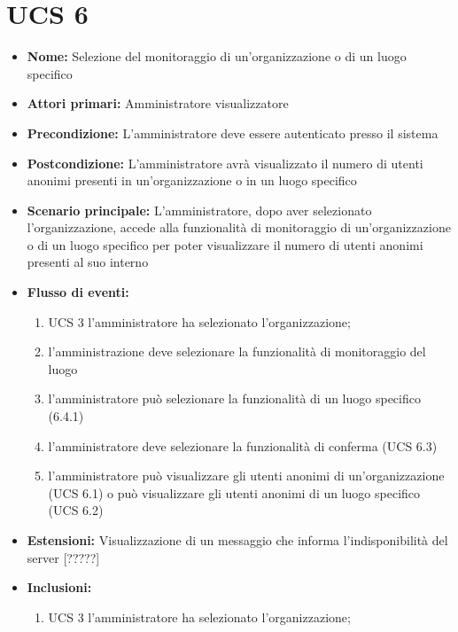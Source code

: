 \section{UCS 6}%
\begin{itemize}
\item \textbf{Nome:} Selezione del monitoraggio di un'organizzazione o di un luogo specifico
\item \textbf{Attori primari:} Amministratore visualizzatore
\item \textbf{Precondizione:} L’amministratore deve essere autenticato presso il sistema
\item \textbf{Postcondizione:} L’amministratore avrà visualizzato il numero di utenti anonimi presenti in un'organizzazione o in un luogo specifico
\item \textbf{Scenario principale:} L’amministratore, dopo aver selezionato l'organizzazione, accede alla funzionalità di monitoraggio di un'organizzazione o di un luogo specifico per poter visualizzare il numero di utenti anonimi presenti al suo interno
\item \textbf{Flusso di eventi:} 
\begin{enumerate}
	\item UCS 3 l'amministratore ha selezionato l'organizzazione;
	\item l'amministrazione deve selezionare la funzionalità di monitoraggio del luogo
	\item l'amministratore può selezionare la funzionalità di un luogo specifico (6.4.1)
	\item l'amministratore deve selezionare la funzionalità di conferma (UCS 6.3)
	\item l'amministratore può visualizzare gli utenti anonimi di un'organizzazione (UCS 6.1) o può visualizzare gli utenti anonimi di un luogo specifico (UCS 6.2)
\end{enumerate}
\item \textbf{Estensioni:}  Visualizzazione di un messaggio che informa l’indisponibilità del server [?????]
\item \textbf{Inclusioni:}
\begin{enumerate}
	\item UCS 3 l'amministratore ha selezionato l'organizzazione;
\end{enumerate}
\end{itemize}

